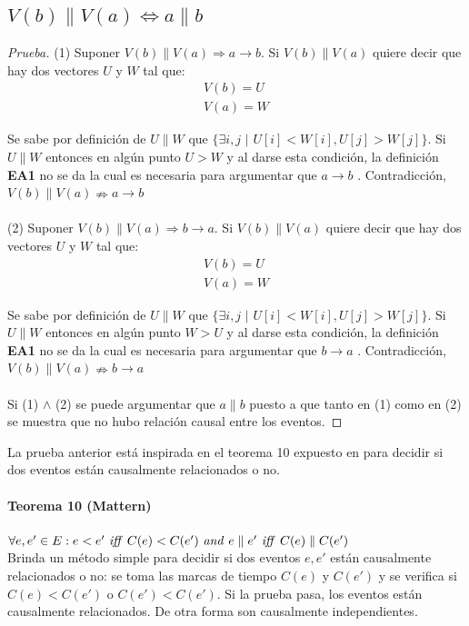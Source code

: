\documentclass[12pt, times]{simauth}
\begin{document}
\subsection{$V(b) \parallel V(a) \Longleftrightarrow a \parallel b$}
\begin{proof}[Prueba]
(1) Suponer $V(b) \parallel V(a) \Rightarrow a \to b$. Si $V(b) \parallel V(a)$ quiere decir que hay dos vectores $U$ y $W$ tal que:
\begin{align*}
V(b) = U\\
V(a) = W 
\end{align*}

Se sabe por definición de $U \parallel W$ que $\{\exists i,j$ $|$ $U[i] < W[i], U[j] > W[j]\}$. Si $U \parallel W$ entonces en algún punto $U > W$ y al darse esta condición, la definición \textbf{EA1} no se da la cual es necesaria para argumentar que $a \to b$ . Contradicción, $V(b) \parallel V(a) \nRightarrow a \to b$ 

\paragraph{} (2) Suponer $V(b) \parallel V(a) \Rightarrow b \to a$. Si $V(b) \parallel V(a)$ quiere decir que hay dos vectores $U$ y $W$ tal que:
\begin{align*}
V(b) = U\\
V(a) = W 
\end{align*}

Se sabe por definición de $U \parallel W$ que $\{\exists i,j$ $|$ $U[i] < W[i], U[j] > W[j]\}$. Si $U \parallel W$ entonces en algún punto $W > U$ y al darse esta condición, la definición \textbf{EA1} no se da la cual es necesaria para argumentar que $b \to a$ . Contradicción, $V(b) \parallel V(a) \nRightarrow b \to a$ 

\paragraph{}Si (1) $\land$ (2) se puede argumentar que $a \parallel b$ puesto a que tanto en (1) como en (2) se muestra que no hubo relación causal entre los eventos.

\end{proof}

La prueba anterior está inspirada en el teorema 10 expuesto en \cite{mattern} para decidir si dos eventos están causalmente relacionados o no. 

\paragraph{Teorema 10 (Mattern)} $\forall e, e' \in E: e < e' \text{ \emph{iff} } C(e) < C(e') \text{ \emph{and} } e \parallel e' \text{\emph{ iff }} C(e) \parallel C(e')$\\
Brinda un método simple para decidir si dos eventos $e, e'$ están causalmente relacionados o no: se toma las marcas de tiempo $C(e)$ y $C(e')$ y se verifica si $C(e) < C(e')$ o $C(e') < C(e')$. Si la prueba pasa, los eventos están causalmente relacionados. De otra forma son causalmente independientes.
\end{document}
